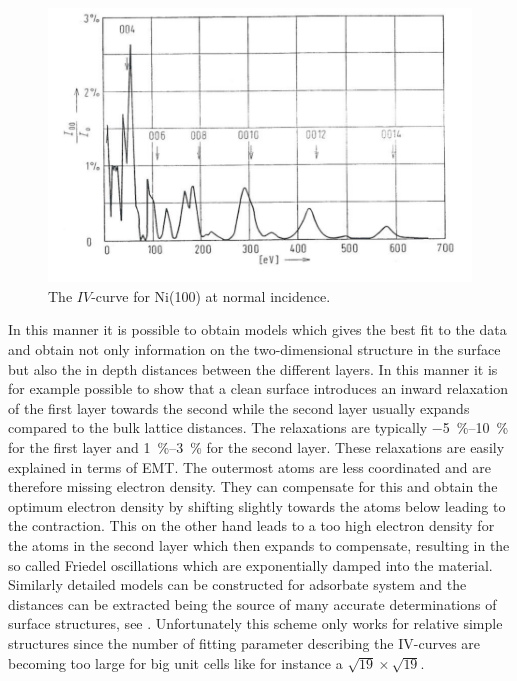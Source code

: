 \begin{figure}[h!]
	\begin{center}
	\includegraphics[scale=4]{figures/09_15.png}
	\caption{The $IV$-curve for Ni(100) at normal incidence.}
	\label{fig:ivni}
	\end{center}
\end{figure}

In this manner it is possible to obtain models which gives the best fit to the  data and obtain not only information on the two-dimensional structure in the surface but also the in depth distances between the different layers. In this manner it is for example possible to show that a clean  surface introduces an inward relaxation of the first layer towards the second while the second layer usually expands compared to the bulk lattice distances. The relaxations are typically \SIrange{-5}{10}{\percent} for the first layer and \SIrange{1}{3}{\percent} for the second layer. These relaxations are easily explained in terms of EMT. The outermost atoms are less coordinated and are therefore missing electron density. They can compensate for this and obtain the optimum electron density by shifting slightly towards the atoms below leading to the contraction. This on the other hand leads to a too high electron density for the atoms in the second layer which then expands to compensate, resulting in the so called Friedel oscillations which are exponentially damped into the material. Similarly detailed models can be constructed for adsorbate system and the distances can be extracted being the source of many accurate determinations of surface structures, see \cite{Somorjai}. Unfortunately this scheme only works for relative simple structures since the number of fitting parameter describing the IV-curves  are becoming too large for big unit cells like for instance a $\sqrt{19}\times\sqrt{19}$.
